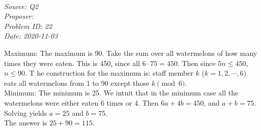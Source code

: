 \SSbreak\\
\emph{Source:  Q2}\\
\emph{Proposer: \Pss}\\
\emph{Problem ID: 22}\\
\emph{Date: 2020-11-03}\\
\SSbreak

\bigskip

\begin{solution}\hfil\medskip

    Maximum: The maximum is 90. Take the sum over all watermelons of how many times they were eaten. 
    This is 450, since all $6 \cdot 75 = 450$. Then since $5n \leq 450$, $n \leq 90$. T
    he construction for the maximum is: staff member $k$ ($k = 1, 2, \cdots, 6$) eats all watermelons from 1 to 90 except those $k \pmod6$. \\

    Minimum: The minimum is 25. We intuit that in the minimum case all the watermelons were either eaten 6 times or 4. 
    Then $6a + 4b = 450$, and $a + b = 75$. Solving yields $a = 25$ and $b = 75$. \\

    The answer is $25 + 90 = \boxed{115}$. 
\end{solution}\bigskip
